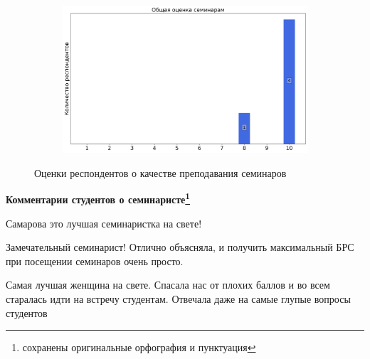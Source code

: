\begin{figure}[H]
\begin{subfigure}[b]{0.45\textwidth}
			\end{subfigure}
			\begin{subfigure}[b]{0.45\textwidth}
				\centering
				\includegraphics[width=\textwidth]{images/3 course/ТФКП/seminarists-marks-Самарова С.С.-3.png}
			\end{subfigure}	
			\caption{Оценки респондентов о качестве преподавания семинаров}
		\end{figure}

		\textbf{Комментарии студентов о семинаристе\protect\footnote{сохранены оригинальные орфография и пунктуация}}
            \begin{commentbox} 
                Самарова это лучшая семинаристка на свете! 
            \end{commentbox} 
        
            \begin{commentbox} 
                Замечательный семинарист! Отлично объясняла, и получить максимальный БРС при посещении семинаров очень просто. 
            \end{commentbox} 
        
            \begin{commentbox} 
                Самая лучшая женщина на свете. Спасала нас от плохих баллов и во всем старалась идти на встречу студентам. Отвечала даже на самые глупые вопросы студентов 
            \end{commentbox} 



